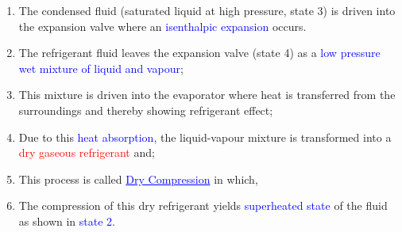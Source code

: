 \documentclass[10pt,compress]{beamer}
\begin{document}
\begin{frame}
\begin{columns}
\begin{column}[c]{0.5\linewidth}
\begin{enumerate}[(1)]
   \item <1-> The condensed fluid (saturated liquid at high pressure, state 3) is driven into the expansion valve where an \textcolor{blue}{isenthalpic expansion} occurs.
   \item <1-> The refrigerant fluid leaves the expansion valve (state 4) as a \textcolor{blue}{low pressure wet mixture of liquid and vapour};
   \item <2-> This mixture is driven into the evaporator where heat is transferred from the surroundings and thereby showing refrigerant effect; 
   \item <2-> Due to this \textcolor{blue}{heat absorption}, the liquid-vapour mixture is transformed into a \textcolor{red}{dry gaseous refrigerant} and;
   \item <3-> This process is called \textcolor{blue}{\underline{Dry Compression}} in which,
   \item <3-> The compression of this dry refrigerant yields \textcolor{blue}{superheated state} of the fluid as shown in \textcolor{blue}{state 2}.
  \end{enumerate}
 \end{column}  
\end{columns}
\end{frame}
\end{document}
